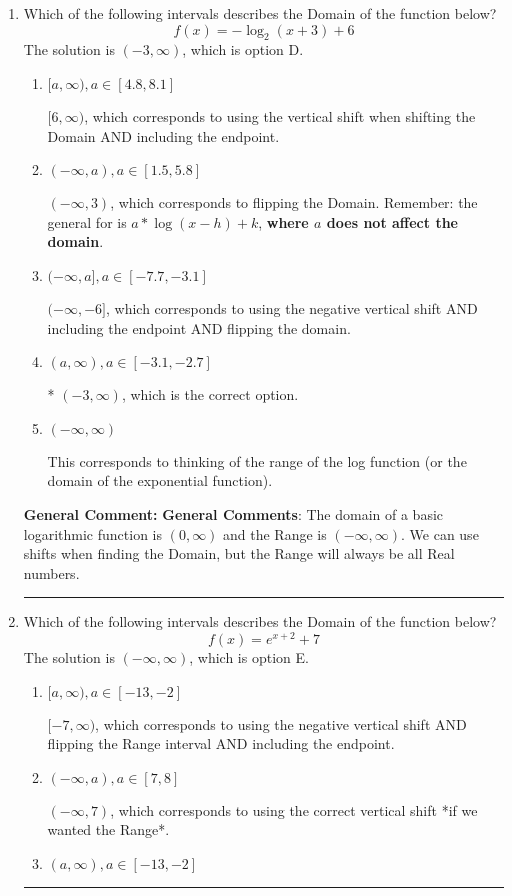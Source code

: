 \documentclass{extbook}[14pt]
\newcommand{\litem}[1]{\item #1

\rule{\textwidth}{0.4pt}}
\begin{document}
\begin{enumerate}\litem{
Which of the following intervals describes the Domain of the function below?
\[ f(x) = -\log_2{(x+3)}+6 \]The solution is \( (-3, \infty) \), which is option D.\begin{enumerate}[label=\Alph*.]
\item \( [a, \infty), a \in [4.8, 8.1] \)

$[6, \infty)$, which corresponds to using the vertical shift when shifting the Domain AND including the endpoint.
\item \( (-\infty, a), a \in [1.5, 5.8] \)

$(-\infty, 3)$, which corresponds to flipping the Domain. Remember: the general for is $a*\log(x-h)+k$, \textbf{where $a$ does not affect the domain}.
\item \( (-\infty, a], a \in [-7.7, -3.1] \)

$(-\infty, -6]$, which corresponds to using the negative vertical shift AND including the endpoint AND flipping the domain.
\item \( (a, \infty), a \in [-3.1, -2.7] \)

* $(-3, \infty)$, which is the correct option.
\item \( (-\infty, \infty) \)

This corresponds to thinking of the range of the log function (or the domain of the exponential function).
\end{enumerate}

\textbf{General Comment:} \textbf{General Comments}: The domain of a basic logarithmic function is $(0, \infty)$ and the Range is $(-\infty, \infty)$. We can use shifts when finding the Domain, but the Range will always be all Real numbers.
}
\litem{
Which of the following intervals describes the Domain of the function below?
\[ f(x) = e^{x+2}+7 \]The solution is \( (-\infty, \infty) \), which is option E.\begin{enumerate}[label=\Alph*.]
\item \( [a, \infty), a \in [-13, -2] \)

$[-7, \infty)$, which corresponds to using the negative vertical shift AND flipping the Range interval AND including the endpoint.
\item \( (-\infty, a), a \in [7, 8] \)

$(-\infty, 7)$, which corresponds to using the correct vertical shift *if we wanted the Range*.
\item \( (a, \infty), a \in [-13, -2] \)


\end{enumerate}}
\end{enumerate}
\end{document}
